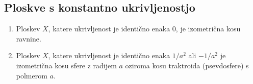 \subsection{Ploskve s konstantno ukrivljenostjo}
\begin{izrek}
\label{izr_klasifikacija_ploskev_z_ukrivljenostjo_0}\begin{enumerate}
    \item Ploskev $X$, katere ukrivljenost je identično enaka $0$, je izometrična kosu ravnine.
    \item Ploskev $X$, katere ukrivljenost je identično enaka $1 / a^2$ ali $- 1 / a^2$ je izometrična kosu sfere z radijem $a$ oziroma
    kosu traktroida (psevdosfere) s polmerom $a$.
 \end{enumerate}
\end{izrek}

